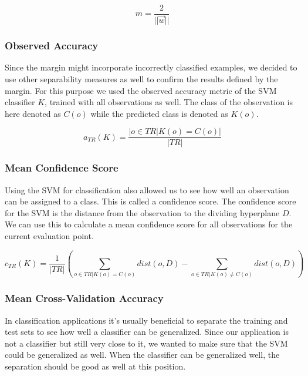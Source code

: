 \documentclass[pdftex,12pt,a4paper]{report}
\begin{document}
\begin{equation}
m = \frac{2}{||\vec{w}||}
\end{equation}

\subsubsection{Observed Accuracy}

Since the margin might incorporate incorrectly classified examples, we decided to use other separability measures
as well to confirm the results defined by the margin. For this purpose we used the observed accuracy metric of the SVM classifier $K$, trained with all observations as well. The class of the observation is here denoted as $C(o)$
while the predicted class is denoted as $K(o)$.

\begin{equation}
a_{TR}(K) = \frac{|o \in TR | K(o) = C(o)|}{|TR|}
\end{equation}

\subsubsection{Mean Confidence Score}
\label{subsub:mean-confidence-score}

Using the SVM for classification also allowed us to see how well an observation can be assigned to a class. This
is called a confidence score. The confidence score for the SVM is the distance from the observation to the dividing
hyperplane $D$. We can use this to calculate a mean confidence score for all observations for the current evaluation point.

\begin{equation}
c_{TR}(K) = \frac{1}{|TR|} (\sum_{o \in TR | K(o) = C(o)} dist(o, D) - \sum_{o \in TR | K(o) \neq C(o)} dist(o, D))
\end{equation}

\subsubsection{Mean Cross-Validation Accuracy}
\label{subsub:cross-validation-accuracy}

In classification applications it's usually beneficial to separate the training and test sets to see how well a
classifier can be generalized. Since our application is not a classifier but still very close to it, we wanted
to make sure that the SVM could be generalized as well. When the classifier can be generalized well, the separation
should be good as well at this position.
\end{document}
